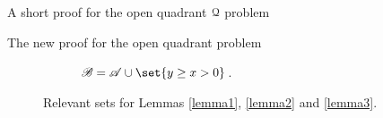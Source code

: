 \documentclass[11pt, a4paper, english, twoside, notitlepage, openright]{report}
\begin{document}
\begin{chapter}{A short proof for the open quadrant $\mathcal{Q}$ problem}
\begin{section}{The new proof for the open quadrant problem}
\begin{figure}[h]
\begin{subfigure}{.5\linewidth}
\caption{$\mathscr{B}=\mathscr{A}\cup\set{y\ge x>0}$.\label{fig:setB}}
\end{subfigure}
\caption{Relevant sets for Lemmas \ref{lemma1}, \ref{lemma2} and \ref{lemma3}.\label{fig:setsAB}}
\end{figure}


\end{section}
\end{chapter}
\end{document}
